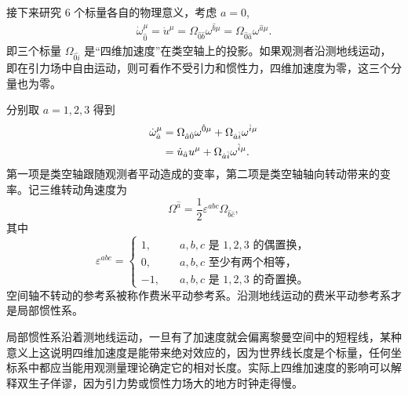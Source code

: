 \documentclass[UTF8, 12pt, a4paper, oneside, onecolumn, fontset=none]{ctexart}
\begin{document}
接下来研究 6 个标量各自的物理意义，考虑 $a=0$,
\begin{align}
\dot{\omega}^{\mu}_{\hat{0}}=\dot{u}^{\mu}=\Omega_{\hat{0}\hat{b}}\omega^{\hat{b}\mu}=\Omega_{\hat{0}\hat{a}}\omega^{\hat{a}\mu}.
\end{align}
即三个标量 $\Omega_{\hat{0}\hat{i}}$ 是“四维加速度”在类空轴上的投影。如果观测者沿测地线运动，即在引力场中自由运动，则可看作不受引力和惯性力，四维加速度为零，这三个分量也为零。

分别取 $a=1, 2, 3$ 得到
\begin{align}
\dot{\omega}^{\mu}_{\hat{a}}&=\Omega_{\hat{a}\hat{0}}\omega^{\hat{0}\mu}+\Omega_{\hat{a}\hat{i}}\omega^{\hat{i}\mu}\notag\\
&=\dot{u}_{\hat{a}}u^{\mu}+\Omega_{\hat{a}\hat{i}}\omega^{\hat{i}\mu}.
\end{align}
第一项是类空轴跟随观测者平动造成的变率，第二项是类空轴轴向转动带来的变率。记三维转动角速度为
\begin{equation}
\Omega^{\hat{a}}=\frac{1}{2}\varepsilon^{abc}\Omega_{\hat{b}\hat{c}},
\end{equation}
其中
\begin{equation}
\varepsilon^{abc}=
\begin{cases}
1,&\quad \text{$a, b, c$ 是 $1, 2, 3$ 的偶置换，}\\
0,&\quad \text{$a, b, c$ 至少有两个相等，}\\
-1,&\quad \text{$a, b, c$ 是 $1, 2, 3$ 的奇置换。}
\end{cases}
\end{equation}
空间轴不转动的参考系被称作费米平动参考系。沿测地线运动的费米平动参考系才是局部惯性系。

局部惯性系沿着测地线运动，一旦有了加速度就会偏离黎曼空间中的短程线，某种意义上这说明四维加速度是能带来绝对效应的，因为世界线长度是个标量，任何坐标系中都应当能用观测量理论确定它的相对长度。实际上四维加速度的影响可以解释双生子佯谬，因为引力势或惯性力场大的地方时钟走得慢。
\end{document}

